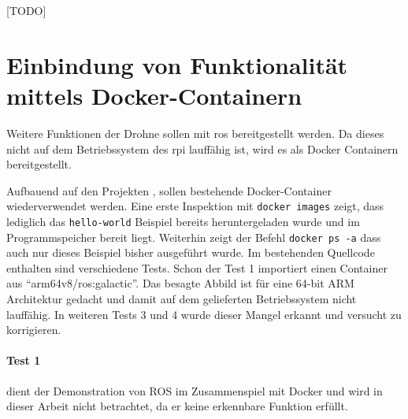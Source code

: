 [TODO]

\section{Einbindung von Funktionalität mittels Docker-Containern}
Weitere Funktionen der Drohne sollen mit \gls{ros} bereitgestellt werden. Da dieses nicht auf dem Betriebssystem des \gls{rpi} lauffähig ist, wird es als Docker Containern bereitgestellt.

Aufbauend auf den Projekten \cite{wirthErweiterungBestehendenDrohne2022}, \cite{wirthErweiterungBestehendenDrohne2022a} sollen bestehende Docker-Container wiederverwendet werden. Eine erste Inspektion mit \texttt{docker images} zeigt, dass lediglich das \texttt{hello-world} Beispiel bereits heruntergeladen wurde und im Programmspeicher bereit liegt. Weiterhin zeigt der Befehl \texttt{docker ps -a} dass auch nur dieses Beispiel bisher ausgeführt wurde. Im bestehenden Quellcode enthalten sind verschiedene Tests. Schon der Test 1 importiert einen Container aus \enquote{arm64v8/ros:galactic}. Das besagte Abbild ist für eine 64-bit ARM Architektur gedacht und damit auf dem gelieferten Betriebssystem nicht lauffähig. In weiteren Tests 3 und 4 wurde dieser Mangel erkannt und versucht zu korrigieren.

\paragraph*{Test 1} dient der Demonstration von ROS im Zusammenspiel mit Docker und wird in dieser Arbeit nicht betrachtet, da er keine erkennbare Funktion erfüllt.

